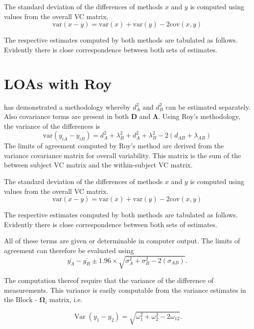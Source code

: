 \documentclass[12pt, a4paper]{report}
\theoremstyle{plain}
\theoremstyle{definition}
\theoremstyle{remark}
\begin{document}
The standard deviation of the differences of methods $x$ and $y$ is computed using values from the overall VC matrix.
\[
\mbox{var}(x - y ) = \mbox{var} ( x )  + \mbox{var} ( y ) - 2\mbox{cov} ( x ,y )
\]


The respective estimates computed by both methods are tabulated as follows. Evidently there is close correspondence between both sets of estimates.



\section{LOAs with Roy}
\citet{ARoy2009} has demonstrated a methodology whereby $d^2_{A}$ and $d^2_{B}$ can be estimated separately. Also covariance terms are present in both $\boldsymbol{D}$ and $\boldsymbol{\Lambda}$. Using Roy's methodology, the variance of the differences is
\begin{equation}
\mbox{var} (y_{iA}-y_{iB})= d^2_{A} + \lambda^2_{B} + d^2_{A} + \lambda^2_{B} - 2(d_{AB} + \lambda_{AB})
\end{equation}		
The limits of agreement computed by Roy's method are derived from the variance covariance matrix for overall variability.
This matrix is the sum of the between subject VC matrix and the within-subject VC matrix.
		
The standard deviation of the differences of methods $x$ and $y$ is computed using values from the overall VC matrix.
		\[
		\mbox{var}(x - y ) = \mbox{var} ( x )  + \mbox{var} ( y ) - 2\mbox{cov} ( x ,y )
		\]
		
		
The respective estimates computed by both methods are tabulated as follows. Evidently there is close correspondence between both sets of estimates.
		

All of these terms are given or determinable in computer output.
The limits of agreement can therefore be evaluated using
\begin{equation}
\bar{y_{A}}-\bar{y_{B}} \pm 1.96 \times \sqrt{ \sigma^2_{A} + \sigma^2_{B}  - 2(\sigma_{AB})}.
\end{equation}

The computation thereof require that the variance of the difference of measurements. This variance is easily computable from the  variance estimates in the ${\mbox{Block - }\boldsymbol \Omega_{i}}$ matrix, i.e.

\[
\operatorname{Var}(y_1 - y_2) = \sqrt{ \omega^2_1 + \omega^2_2 - 2\omega_{12}}.
\]
\end{document}

